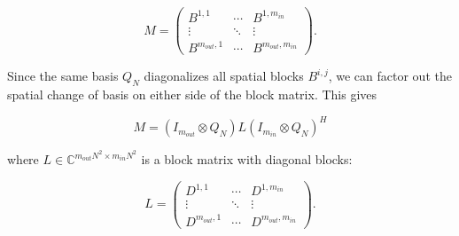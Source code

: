 $$
M =
\begin{pmatrix}
B^{1,1} & \cdots & B^{1,m_{in}} \\
\vdots & \ddots & \vdots \\
B^{m_{out},1} & \cdots & B^{m_{out},m_{in}}
\end{pmatrix}.
$$

Since the same basis $Q_N$ diagonalizes all spatial blocks $B^{i,j}$, we can factor out the spatial
change of basis on either side of the block matrix. This gives

\begin{equation}
    M = (I_{m_{out}} \otimes Q_N) L (I_{m_{in}} \otimes Q_N)^H
    \label{eq:factorisation_M}
\end{equation}

where $L \in \mathbb{C}^{m_{out}N^2 \times m_{in}N^2}$ is a block matrix with diagonal blocks:

$$
L =
\begin{pmatrix}
D^{1,1} & \cdots & D^{1,m_{in}} \\
\vdots & \ddots & \vdots \\
D^{m_{out},1} & \cdots & D^{m_{out},m_{in}}
\end{pmatrix}.
$$

